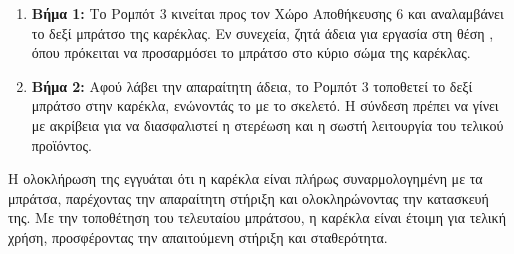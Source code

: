 \begin{enumerate}
    \item \textbf{Βήμα 1:} Το Ρομπότ 3 κινείται προς τον Χώρο Αποθήκευσης 6 και αναλαμβάνει το δεξί μπράτσο της καρέκλας. Εν συνεχεία, ζητά άδεια για εργασία στη θέση , όπου πρόκειται να προσαρμόσει το μπράτσο στο κύριο σώμα της καρέκλας.
    \item \textbf{Βήμα 2:} Αφού λάβει την απαραίτητη άδεια, το Ρομπότ 3 τοποθετεί το δεξί μπράτσο στην καρέκλα, ενώνοντάς το με το σκελετό. Η σύνδεση πρέπει να γίνει με ακρίβεια για να διασφαλιστεί η στερέωση και η σωστή λειτουργία του τελικού προϊόντος.
\end{enumerate}

Η ολοκλήρωση της  εγγυάται ότι η καρέκλα είναι πλήρως συναρμολογημένη με τα μπράτσα, παρέχοντας την απαραίτητη στήριξη και ολοκληρώνοντας την κατασκευή της. Με την τοποθέτηση του τελευταίου μπράτσου, η καρέκλα είναι έτοιμη για τελική χρήση, προσφέροντας την απαιτούμενη στήριξη και σταθερότητα.